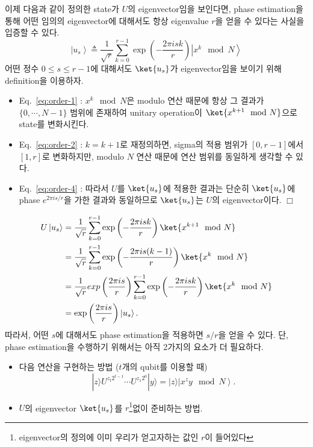 이제 다음과 같이 정의한 state가 $U$의 eigenvector임을 보인다면, phase estimation을 통해 어떤 임의의 eigenvector에 대해서도 항상 eigenvalue $r$을 얻을 수 있다는 사실을 입증할 수 있다.
\begin{equation*}
  \left|u_s\right\rangle \triangleq \frac{1}{\sqrt{r}} \sum_{k=0}^{r-1} \exp \left(-\frac{2 \pi i s k}{r}\right)\left|x^k \mod N\right\rangle
  \end{equation*}
어떤 정수 $0\le s \le r-1$에 대해서도 $\ket{u_s}$가 eigenvector임을 보이기 위해 definition을 이용하자. 
\begin{itemize}
  \item Eq.~\eqref{eq:order-1} : $x^{k} \mod N$은 modulo 연산 때문에 항상 그 결과가 $\{0, \cdots, N-1\}$ 범위에 존재하여 unitary operation이 $\ket{x^{k+1} \mod N}$으로 state를 변화시킨다.
  \item Eq.~\eqref{eq:order-2} : $k = k+1$로 재정의하면, sigma의 적용 범위가 $[0, r-1]$에서 $[1, r]$로 변화하지만, modulo $N$ 연산 때문에 연산 범위를 동일하게 생각할 수 있다.
  \item Eq.~\eqref{eq:order-4} : 따라서 $U$를 $\ket{u_s}$에 적용한 결과는 단순히 $\ket{u_s}$에 phase $e^{2\pi is / r}$을 가한 결과와 동일하므로 $\ket{u_s}$는 $U$의 eigenvector이다. $\Box$
\end{itemize}
\begin{align}
  U\left|u_s\right\rangle &= \frac{1}{\sqrt{r}} \sum^{r-1}_{k=0} \exp \left(- \frac{2\pi isk}{r}\right) \ket{x^{k+1} \mod N} \label{eq:order-1}\\
  &= \frac{1}{\sqrt{r}} \sum^{r-1}_{k=0} \exp \left(- \frac{2\pi is(k-1)}{r}\right) \ket{x^{k} \mod N} \label{eq:order-2}\\
  &= \frac{1}{\sqrt{r}}exp \left(\frac{2\pi is}{r}\right) \sum^{r-1}_{k=0} \exp \left(- \frac{2\pi isk}{r}\right) \ket{x^{k} \mod N} \label{eq:order-3}\\
  &=\exp \left(\frac{2 \pi i s}{r}\right)\left|u_s\right\rangle \label{eq:order-4}.
\end{align}
따라서, 어떤 $s$에 대해서도 phase estimation을 적용하면 $s/r$을 얻을 수 있다.
\newpage
단, phase estimation을 수행하기 위해서는 아직 2가지의 요소가 더 필요하다.
\begin{itemize}
  \item 다음 연산을 구현하는 방법 ($t$개의 qubit를 이용할 때)
  \begin{equation*}
    |z\rangle U^{z_t 2^{t-1}} \cdots U^{z_1 2^0}|y\rangle=|z\rangle\left|x^z y \mod N\right\rangle .
  \end{equation*}
  \item $U$의 eigenvector $\ket{u_s}$를 $r$\footnote{eigenvector의 정의에 이미 우리가 얻고자하는 값인 $r$이 들어있다}없이 준비하는 방법.
\end{itemize}

